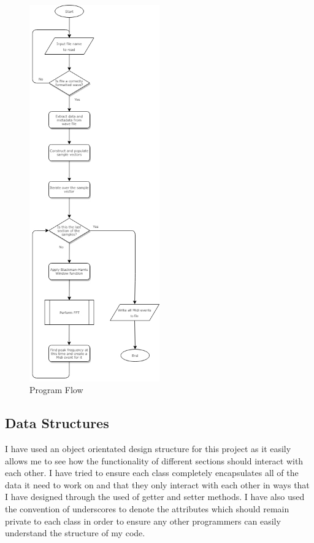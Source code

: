 \documentclass[12pt]{report}
\begin{document}
\begin{figure}[H]
	\centering
	\includegraphics[width=0.5\textwidth]{flow_1.jpg}
	\caption{Program Flow}
	\centering
\end{figure}

\subsection*{Data Structures}
I have used an object orientated design structure for this project as it easily allows me to see how the functionality of different sections should interact with each other. I have tried to ensure each class completely encapsulates all of the data it need to work on and that they only interact with each other in ways that I have designed through the used of getter and setter methods. I have also used the convention of underscores to denote the attributes which should remain private to each class in order to ensure any other programmers can easily understand the structure of my code.
\end{document}

